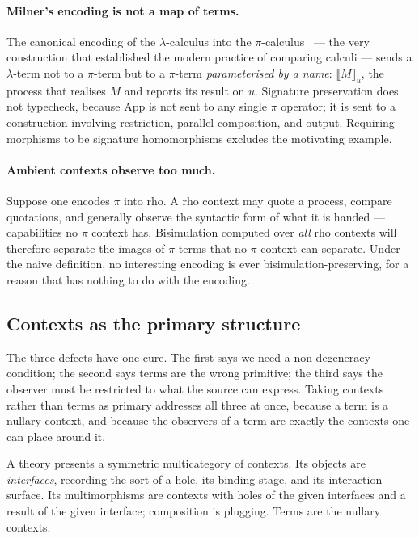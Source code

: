 \documentclass[11pt]{article}
\theoremstyle{definition}
\theoremstyle{plain}
\theoremstyle{remark}
\newcommand{\sem}[1]{\llbracket #1 \rrbracket}
\begin{document}
\paragraph{Milner's encoding is not a map of terms.} The canonical encoding of the
$\lambda$-calculus into the $\pi$-calculus~\cite{Milner1992} --- the very construction
that established the modern practice of comparing calculi --- sends a $\lambda$-term not
to a $\pi$-term but to a $\pi$-term \emph{parameterised by a name}: $\sem{M}_u$, the
process that realises $M$ and reports its result on $u$. Signature preservation does not
typecheck, because $\mathrm{App}$ is not sent to any single $\pi$ operator; it is sent to
a construction involving restriction, parallel composition, and output. Requiring
morphisms to be signature homomorphisms excludes the motivating example.

\paragraph{Ambient contexts observe too much.} Suppose one encodes $\pi$ into rho. A rho
context may quote a process, compare quotations, and generally observe the syntactic
form of what it is handed --- capabilities no $\pi$ context has. Bisimulation computed
over \emph{all} rho contexts will therefore separate the images of $\pi$-terms that no
$\pi$ context can separate. Under the naive definition, no interesting encoding is ever
bisimulation-preserving, for a reason that has nothing to do with the encoding.

\subsection{Contexts as the primary structure}

The three defects have one cure. The first says we need a non-degeneracy condition; the
second says terms are the wrong primitive; the third says the observer must be
restricted to what the source can express. Taking contexts rather than terms as primary
addresses all three at once, because a term is a nullary context, and because the
observers of a term are exactly the contexts one can place around it.

A theory presents a symmetric multicategory of contexts. Its objects are
\emph{interfaces}, recording the sort of a hole, its binding stage, and its interaction
surface. Its multimorphisms are contexts with holes of the given interfaces and a result
of the given interface; composition is plugging. Terms are the nullary contexts.
\end{document}
